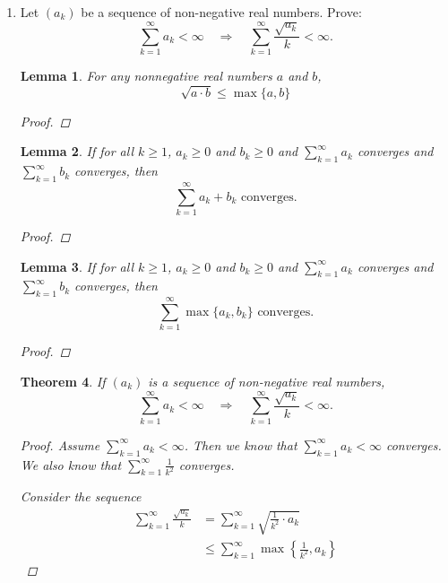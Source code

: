 \documentclass{amsart}
\newtheorem{theorem}{Theorem}
\newtheorem{lemma}[theorem]{Lemma}
\begin{document}
\begin{enumerate}[1.]
\newpage

\item  Let $(a_k)$ be a sequence of non-negative real numbers. Prove:   
\[ \sum_{k=1}^{\infty} a_k < \infty \quad \Rightarrow \quad \sum_{k=1}^{\infty} \frac{\sqrt{a_k}}{k} < \infty. \]
\begin{lemma}
    For any nonnegative real numbers $a$ and $b$,
    \[
        \sqrt{a \cdot b} \leq \max\{a,b\}    
    \]
    \begin{proof}

    \end{proof}
\end{lemma}
\begin{lemma}
    If for all $k \geq 1$, $a_k \geq 0$ and $b_k \geq 0$ and $\displaystyle \sum_{k=1}^\infty a_k$ converges and $\displaystyle \sum_{k=1}^\infty b_k$ converges, then
    \[
        \displaystyle \sum_{k=1}^\infty a_k + b_k \text{ converges.}
    \]
    \begin{proof}

    \end{proof}
\end{lemma}
\begin{lemma}
    If for all $k \geq 1$, $a_k \geq 0$ and $b_k \geq 0$ and $\displaystyle \sum_{k=1}^\infty a_k$ converges and $\displaystyle \sum_{k=1}^\infty b_k$ converges, then
    \[
        \displaystyle \sum_{k=1}^\infty \max\{a_k, b_k\} \text{ converges.}
    \]
    \begin{proof}

    \end{proof}
\end{lemma}
\begin{theorem} 
    If $(a_k)$ is a sequence of non-negative real numbers,
    \[ \sum_{k=1}^{\infty} a_k < \infty \quad \Rightarrow \quad \sum_{k=1}^{\infty} \frac{\sqrt{a_k}}{k} < \infty. \]
    \begin{proof}
        Assume $\sum_{k=1}^{\infty} a_k < \infty$. Then we know that $\sum_{k=1}^{\infty} a_k < \infty$ converges.
        We also know that $\sum_{k=1}^{\infty} \frac{1}{k^2}$ converges.

        Consider the sequence 
        \begin{align*}
            \sum_{k=1}^{\infty} \frac{\sqrt{a_k}}{k} &= \sum_{k=1}^{\infty} \sqrt{\frac{1}{k^2} \cdot a_k } \\
            &\leq \sum_{k=1}^{\infty} \max \left\{ \frac{1}{k^2}, a_k \right\}
        \end{align*}
    \end{proof}
\end{theorem}




\end{enumerate}
\end{document}
